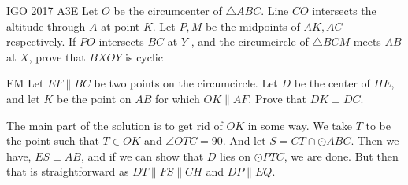 \newpage
{}
{IGO 2017 A3}{E}{
    Let $O$ be the circumcenter of $\triangle ABC$. Line $CO$ intersects the
    altitude through $A$ at point $K$. Let $P, M$ be the midpoints of $AK, AC$
    respectively. If $PO$ intersects $BC$ at $Y$ , and the circumcircle of
    $\triangle BCM$ meets $AB$ at $X$, prove that $BXOY$ is cyclic
}
\begin{minipage}{.5\linewidth}
\end{minipage}\hfill%
\begin{minipage}{.49\linewidth}
\end{minipage}



\begin{minipage}{.5\linewidth}
    \prob{}
    {}{EM}{
        Let $EF\parallel BC$ be two points on the circumcircle. Let $D$ be the center of
        $HE$, and let $K$ be the point on $AB$ for which $OK\parallel AF$. Prove that
        $DK\perp DC$.
    }

    \begin{solution}
        The main part of the solution is to get rid of $OK$ in some way. We take
        $T$ to be the point such that $T\in OK$ and $\angle OTC = 90$. And let $S
        = CT\cap \odot ABC$. Then we have, $ES\perp AB$, and if we can show that
        $D$ lies on $\odot PTC$, we are done. But then that is straightforward as
        $DT\parallel FS\parallel CH$ and $DP\parallel EQ$.
    \end{solution}
\end{minipage}\hfill%
\begin{minipage}{.48\linewidth}
\end{minipage}


\newpage
{}


